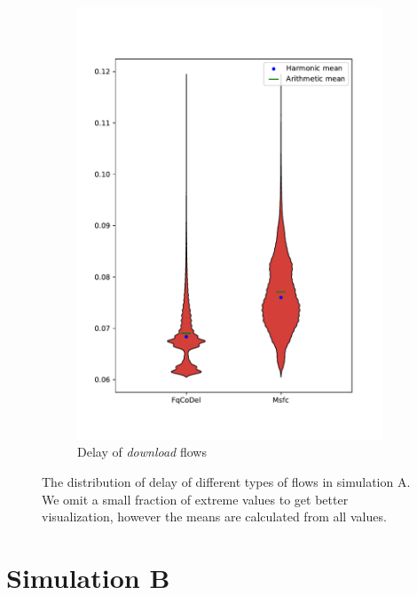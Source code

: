 \begin{figure}
\begin{subfigure}[b]{0.475\textwidth}
		\includegraphics[width=\textwidth]{drawings/type5-delay-down_A}
		\caption[]%
		{{\small Delay of \emph{download} flows}}    
		\label{fig:delay_download}
	\end{subfigure}
	\caption[]
	{\small The distribution of delay of different types of flows in simulation A. We omit a small fraction of extreme values to get better visualization, however the means are calculated from all values.} 
	\label{fig:delay_flows_A}
\end{figure}





\clearpage
\section{Simulation B}



